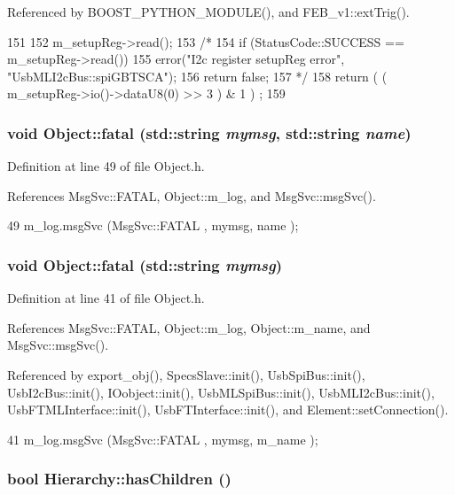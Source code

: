 Referenced by BOOST\_\-PYTHON\_\-MODULE(), and FEB\_\-v1::extTrig().


\begin{DoxyCode}
151                      {
152   m_setupReg->read();
153   /*
154     if (StatusCode::SUCCESS == m_setupReg->read()) {
155     error("I2c register setupReg error", "UsbMLI2cBus::spiGBTSCA");
156     return false;
157     }*/
158   return ( ( m_setupReg->io()->dataU8(0) >> 3 ) & 1 ) ;
159 }
\end{DoxyCode}
\hypertarget{classObject_ae62acd3d09f716220f75f252dc38bc9a}{
\subsubsection[{fatal}]{\setlength{\rightskip}{0pt plus 5cm}void Object::fatal (std::string {\em mymsg}, \/  std::string {\em name})}}
\label{classObject_ae62acd3d09f716220f75f252dc38bc9a}


Definition at line 49 of file Object.h.

References MsgSvc::FATAL, Object::m\_\-log, and MsgSvc::msgSvc().


\begin{DoxyCode}
49 { m_log.msgSvc (MsgSvc::FATAL   , mymsg, name ); }
\end{DoxyCode}
\hypertarget{classObject_aad5a16aac7516ce65bd5ec02ab07fc80}{
\subsubsection[{fatal}]{\setlength{\rightskip}{0pt plus 5cm}void Object::fatal (std::string {\em mymsg})}}
\label{classObject_aad5a16aac7516ce65bd5ec02ab07fc80}


Definition at line 41 of file Object.h.

References MsgSvc::FATAL, Object::m\_\-log, Object::m\_\-name, and MsgSvc::msgSvc().

Referenced by export\_\-obj(), SpecsSlave::init(), UsbSpiBus::init(), UsbI2cBus::init(), IOobject::init(), UsbMLSpiBus::init(), UsbMLI2cBus::init(), UsbFTMLInterface::init(), UsbFTInterface::init(), and Element::setConnection().


\begin{DoxyCode}
41 { m_log.msgSvc (MsgSvc::FATAL   , mymsg, m_name ); }
\end{DoxyCode}
\hypertarget{classHierarchy_a255174fe4d316d2a3f430dcb9dab29f1}{
\subsubsection[{hasChildren}]{\setlength{\rightskip}{0pt plus 5cm}bool Hierarchy::hasChildren ()}}
\label{classHierarchy_a255174fe4d316d2a3f430dcb9dab29f1}


